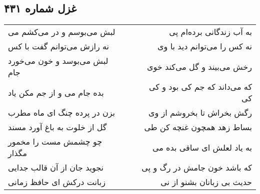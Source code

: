 \begin{center}
\section*{غزل شماره ۴۳۱}
\label{sec:sh431}
\begin{longtable}{l p{0.5cm} r}
لبش می‌بوسم و در می‌کشم می
&&
به آب زندگانی برده‌ام پی
\\
نه رازش می‌توانم گفت با کس
&&
نه کس را می‌توانم دید با وی
\\
لبش می‌بوسد و خون می‌خورد جام
&&
رخش می‌بیند و گل می‌کند خوی
\\
بده جام می و از جم مکن یاد
&&
که می‌داند که جم کی بود و کی کی
\\
بزن در پرده چنگ ای ماه مطرب
&&
رگش بخراش تا بخروشم از وی
\\
گل از خلوت به باغ آورد مسند
&&
بساط زهد همچون غنچه کن طی
\\
چو چشمش مست را مخمور مگذار
&&
به یاد لعلش ای ساقی بده می
\\
نجوید جان از آن قالب جدایی
&&
که باشد خون جامش در رگ و پی
\\
زبانت درکش ای حافظ زمانی
&&
حدیث بی زبانان بشنو از نی
\\
\end{longtable}
\end{center}
